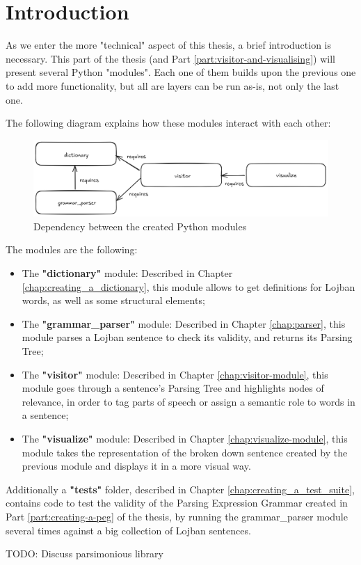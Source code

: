 \chapter{Introduction}

\vspace{0.5cm}

As we enter the more "technical" aspect of this thesis, a brief introduction is necessary. This part of the thesis
(and Part \ref{part:visitor-and-visualising}) will present several Python "modules". Each one of them builds upon the previous one to
add more functionality, but all are layers can be run as-is, not only the last one.\newline

The following diagram explains how these modules interact with each other:\newline

\begin{figure}[H]
\hspace{-1.5cm}
\includegraphics[scale=0.43]{images/module_dependency.png}
\caption{Dependency between the created Python modules}
\end{figure}

The modules are the following: \newline

\begin{itemize}
\item The \textbf{"dictionary"} module: Described in Chapter \ref{chap:creating_a_dictionary},
this module allows to get definitions for Lojban words, as well as some structural elements;
\item The \textbf{"grammar\_parser"} module: Described in Chapter \ref{chap:parser}, this module parses
a Lojban sentence to check its validity, and returns its Parsing Tree;
\item The \textbf{"visitor"} module: Described in Chapter \ref{chap:visitor-module}, this module goes through
a sentence's Parsing Tree and highlights nodes of relevance, in order to tag parts of speech or assign a semantic role
to words in a sentence;
\item The \textbf{"visualize"} module: Described in Chapter \ref{chap:visualize-module}, this module takes the
representation of the broken down sentence created by the previous module and displays it in a more visual way.
\end{itemize}

Additionally a \textbf{"tests"} folder, described in Chapter \ref{chap:creating_a_test_suite}, contains code to
test the validity of the Parsing Expression Grammar created in Part \ref{part:creating-a-peg} of the thesis, by
running the grammar\_parser module several times against a big collection of Lojban sentences.\newline

TODO: Discuss parsimonious library